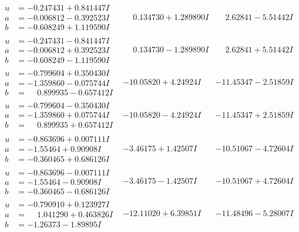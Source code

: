 \documentclass[1p]{elsarticle_modified}
\theoremstyle{definition}
\begin{document}
$$\begin{array}{c|c|c}
\begin{aligned}
u &= -0.247431 + 0.841447 I \\
a &= -0.006812 - 0.392523 I \\
b &= -0.608249 + 1.119590 I\end{aligned}
 & \phantom{-}0.134730 + 1.289890 I & \phantom{-}2.62841 - 5.51442 I \\ \hline\begin{aligned}
u &= -0.247431 - 0.841447 I \\
a &= -0.006812 + 0.392523 I \\
b &= -0.608249 - 1.119590 I\end{aligned}
 & \phantom{-}0.134730 - 1.289890 I & \phantom{-}2.62841 + 5.51442 I \\ \hline\begin{aligned}
u &= -0.799604 + 0.350430 I \\
a &= -1.359860 - 0.075744 I \\
b &= \phantom{-}0.899935 - 0.657412 I\end{aligned}
 & -10.05820 + 4.24924 I & -11.45347 - 2.51859 I \\ \hline\begin{aligned}
u &= -0.799604 - 0.350430 I \\
a &= -1.359860 + 0.075744 I \\
b &= \phantom{-}0.899935 + 0.657412 I\end{aligned}
 & -10.05820 - 4.24924 I & -11.45347 + 2.51859 I \\ \hline\begin{aligned}
u &= -0.863696 + 0.007111 I \\
a &= -1.55464 + 0.90908 I \\
b &= -0.360465 + 0.686126 I\end{aligned}
 & -3.46175 + 1.42507 I & -10.51067 - 4.72604 I \\ \hline\begin{aligned}
u &= -0.863696 - 0.007111 I \\
a &= -1.55464 - 0.90908 I \\
b &= -0.360465 - 0.686126 I\end{aligned}
 & -3.46175 - 1.42507 I & -10.51067 + 4.72604 I \\ \hline\begin{aligned}
u &= -0.790910 + 0.123927 I \\
a &= \phantom{-}1.041290 + 0.463826 I \\
b &= -1.26373 - 1.89895 I\end{aligned}
 & -12.11020 + 6.39851 I & -11.48496 - 5.28007 I \\ \hline\begin{aligned}

\end{aligned}
\end{array}$$
\end{document}
